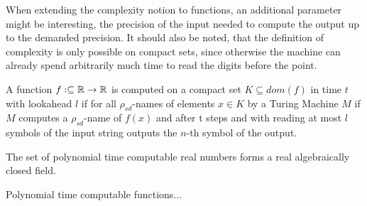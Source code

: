 	When extending the complexity notion to functions, an additional parameter might be interesting, the precision of the input
	needed to compute the output up to the demanded precision.
	It should also be noted, that the definition of complexity is only possible on compact sets, since otherwise the machine can already
	spend arbitrarily much time to read the digits before the point.
	\begin{definition}
		A function $f: \subseteq \mathbb R \to \mathbb R$ is computed on a compact set $K \subseteq dom(f)$ in time $t$ with lookahead $l$ if for all $\rho_{sd}$-names of elements $ x \in K$ by a Turing Machine $M$ if $M$ computes a $\rho_{sd}$-name of $f(x)$ and after t steps and with reading at most $l$ symbols of the input string outputs the $n$-th symbol of the output.   
	\end{definition} 
	\begin{theorem}
		The set of polynomial time computable real numbers forms a real algebraically closed field.
	\end{theorem}
	\begin{example}
	Polynomial time computable functions...
	\end{example}
	
